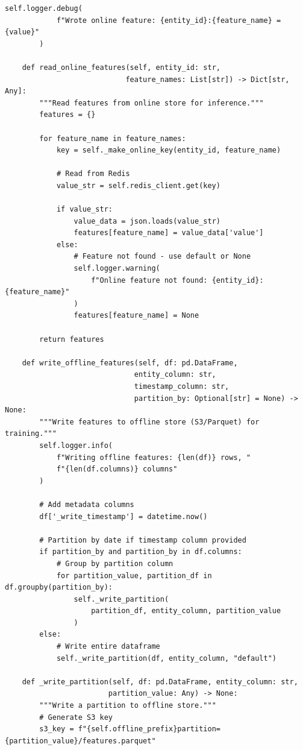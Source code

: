 \begin{lstlisting}[style=python, caption=FeatureStoreIntegrator with Dual Serving Modes]
        self.logger.debug(
            f"Wrote online feature: {entity_id}:{feature_name} = {value}"
        )

    def read_online_features(self, entity_id: str,
                            feature_names: List[str]) -> Dict[str, Any]:
        """Read features from online store for inference."""
        features = {}

        for feature_name in feature_names:
            key = self._make_online_key(entity_id, feature_name)

            # Read from Redis
            value_str = self.redis_client.get(key)

            if value_str:
                value_data = json.loads(value_str)
                features[feature_name] = value_data['value']
            else:
                # Feature not found - use default or None
                self.logger.warning(
                    f"Online feature not found: {entity_id}:{feature_name}"
                )
                features[feature_name] = None

        return features

    def write_offline_features(self, df: pd.DataFrame,
                              entity_column: str,
                              timestamp_column: str,
                              partition_by: Optional[str] = None) -> None:
        """Write features to offline store (S3/Parquet) for training."""
        self.logger.info(
            f"Writing offline features: {len(df)} rows, "
            f"{len(df.columns)} columns"
        )

        # Add metadata columns
        df['_write_timestamp'] = datetime.now()

        # Partition by date if timestamp column provided
        if partition_by and partition_by in df.columns:
            # Group by partition column
            for partition_value, partition_df in df.groupby(partition_by):
                self._write_partition(
                    partition_df, entity_column, partition_value
                )
        else:
            # Write entire dataframe
            self._write_partition(df, entity_column, "default")

    def _write_partition(self, df: pd.DataFrame, entity_column: str,
                        partition_value: Any) -> None:
        """Write a partition to offline store."""
        # Generate S3 key
        s3_key = f"{self.offline_prefix}partition={partition_value}/features.parquet"


\end{lstlisting}
